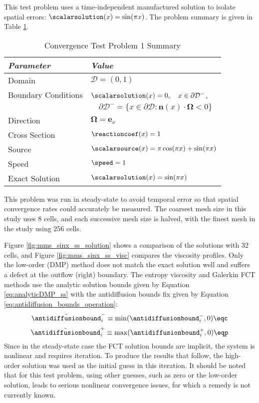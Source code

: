 This test problem uses a time-independent manufactured solution to isolate
spatial errors: $\scalarsolution(x)=\sin(\pi x)$. The problem summary is
given in Table \ref{tab:mms_sinx_ss}.

\begin{table}[htb]\caption{Convergence Test Problem 1 Summary}
\label{tab:mms_sinx_ss}
\centering
\begin{tabular}{l l}\toprule
\emph{Parameter} & \emph{Value}\\\midrule
Domain & $\mathcal{D} = (0,1)$\\
Boundary Conditions & $\scalarsolution(x)=0,\quad x\in\partial\mathcal{D}^-$,\\
   & $\quad\partial\mathcal{D}^-=\{x\in\partial\mathcal{D}:\mathbf{n}(x)
       \cdot\mathbf{\Omega}<0\}$\\
Direction & $\mathbf{\Omega} = \mathbf{e}_x$\\
Cross Section & $\reactioncoef(x)=1$\\
Source & $\scalarsource(x)=\pi\cos(\pi x) + \sin(\pi x)$\\
Speed & $\speed=1$\\
Exact Solution & $\scalarsolution(x)=\sin(\pi x)$\\
\bottomrule\end{tabular}
\end{table}

This problem was run in steady-state to avoid temporal error so that spatial
convergence rates could accurately be measured.
The coarsest mesh size in this study uses 8 cells, and each successive mesh
size is halved, with the finest mesh in the study using 256 cells.

Figure \ref{fig:mms_sinx_ss_solution} shows a comparison of the solutions with
32 cells, and Figure \ref{fig:mms_sinx_ss_visc} compares the viscosity
profiles. Only the low-order (DMP) method does not match the exact solution
well and suffers a defect at the outflow (right) boundary.
The entropy viscosity and Galerkin FCT methods use the analytic solution bounds
given by Equation \eqref{eq:analyticDMP_ss} with the antidiffusion bounds fix given by
Equation \eqref{eq:antidiffusion_bounds_operation}:
\[
  \tilde{\antidiffusionbound}_i^-
    \equiv \min(\antidiffusionbound_i^-, 0)
  \eqc
\]
\[
  \tilde{\antidiffusionbound}_i^+
    \equiv \max(\antidiffusionbound_i^+, 0)
  \eqp
\]
Since in the steady-state
case the FCT solution bounds are implicit, the system is nonlinear and requires
iteration. To produce the results that follow, the high-order solution was
used as the initial guess in this iteration. It should be noted that for this
test problem, using other guesses, such as zero or the low-order solution,
leads to serious nonlinear convergence issues, for which a remedy is not
currently known.


